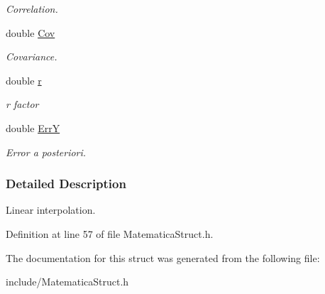 \begin{DoxyCompactItemize}
\begin{DoxyCompactList}\small\item\em \-Correlation. \end{DoxyCompactList}\item 
\hypertarget{structRETTA_a8e12192aad40946228d8a4edc7dceb7f}{double \hyperlink{structRETTA_a8e12192aad40946228d8a4edc7dceb7f}{\-Cov}}\label{structRETTA_a8e12192aad40946228d8a4edc7dceb7f}

\begin{DoxyCompactList}\small\item\em \-Covariance. \end{DoxyCompactList}\item 
\hypertarget{structRETTA_a880a49112fedae68e714341a9a082fb6}{double \hyperlink{structRETTA_a880a49112fedae68e714341a9a082fb6}{r}}\label{structRETTA_a880a49112fedae68e714341a9a082fb6}

\begin{DoxyCompactList}\small\item\em r factor \end{DoxyCompactList}\item 
\hypertarget{structRETTA_a8ca6dcd2c4b3c13b0164f59283c4dd28}{double \hyperlink{structRETTA_a8ca6dcd2c4b3c13b0164f59283c4dd28}{\-Err\-Y}}\label{structRETTA_a8ca6dcd2c4b3c13b0164f59283c4dd28}

\begin{DoxyCompactList}\small\item\em \-Error a posteriori. \end{DoxyCompactList}\end{DoxyCompactItemize}


\subsubsection{\-Detailed \-Description}
\-Linear interpolation. 

\-Definition at line 57 of file \-Matematica\-Struct.\-h.



\-The documentation for this struct was generated from the following file\-:\begin{DoxyCompactItemize}
\item 
include/\-Matematica\-Struct.\-h\end{DoxyCompactItemize}
